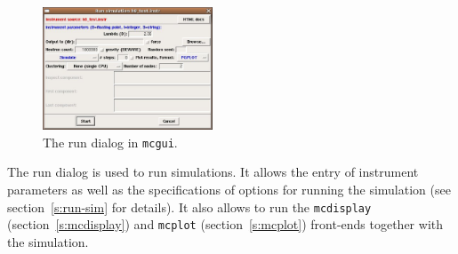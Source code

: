 \begin{figure}[htb!]
  \begin{center}
    \includegraphics[width=0.45\textwidth]{figures/mcgui-run.eps}
  \end{center}
\caption{The run dialog in \texttt{mcgui}.}
\label{fig:mcgui-run}
\end{figure}
%
The run dialog is used to run simulations. It allows the entry of
instrument parameters as well as the specifications of options for
running the simulation (see section~\ref{s:run-sim} for details). It
also allows to run the \verb+mcdisplay+ (section~\ref{s:mcdisplay}) and
\verb+mcplot+ (section~\ref{s:mcplot}) front-ends together with the
simulation.

